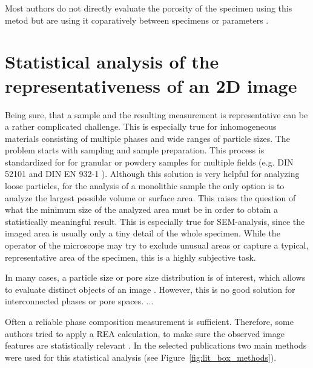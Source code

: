 Most authors do not directly evaluate the porosity of the specimen using this metod but are using it coparatively between specimens or parameters \cite{ghantous.2023, wang.2023}.


\FloatBarrier
\section{Statistical analysis of the representativeness of an 2D image}
\label{sec:2D-representativeness}

Being sure, that a sample and the resulting measurement is representative can be a rather complicated challenge.
This is especially true for inhomogeneous materials consisting of multiple phases and wide ranges of particle sizes.
The problem starts with sampling and sample preparation.
This process is standardized for for granular or powdery samples for multiple fields (e.g. DIN 52101 \cite{din52101.2013} and DIN EN 932-1 \cite{dinen932-1.1996}).
Although this solution is very helpful for analyzing loose particles, for the analysis of a monolithic sample the only option is to analyze the largest possible volume or surface area.
This raises the question of what the minimum size of the analyzed area must be in order to obtain a statistically meaningful result.
This is especially true for \ac{SEM}-analysis, since the imaged area is usually only a tiny detail of the whole specimen.
While the operator of the microscope may try to exclude unusual areas or capture a typical, representative area of the specimen, this is a highly subjective task.

{\color{red}In many cases, a particle size or pore size distribution is of interest, which allows to evaluate distinct objects of an image \cite{odziomek.2016}.
However, this is no good solution for interconnected phases or pore spaces. ...}

Often a reliable phase composition measurement is sufficient.
Therefore, some authors tried to apply a \ac{REA} calculation, to make sure the observed image features are statistically relevant \cite{bosl.1998,kameda.2006,klaver.2012,houben.2014,jiang.2022} .
In the selected publications two main methods were used for this statistical analysis (see Figure~\ref{fig:lit_box_methods}).

